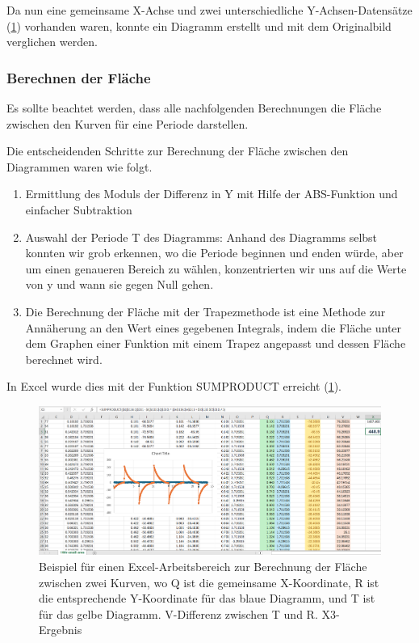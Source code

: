 \documentclass{article}
\begin{document}
Da nun eine gemeinsame X-Achse und zwei unterschiedliche Y-Achsen-Datensätze (\ref{img:excel_example}) vorhanden waren, konnte ein Diagramm erstellt und mit dem Originalbild verglichen werden.

\subsubsection{Berechnen der Fläche} 

Es sollte beachtet werden, dass alle nachfolgenden Berechnungen die Fläche zwischen den Kurven für eine Periode darstellen.

Die entscheidenden Schritte zur Berechnung der Fläche zwischen den Diagrammen waren wie folgt.

\begin{enumerate}
    \item Ermittlung des Moduls der Differenz in Y mit Hilfe der ABS-Funktion und einfacher Subtraktion
    \item Auswahl der Periode T des Diagramms: Anhand des Diagramms selbst konnten wir grob erkennen, wo die Periode beginnen und enden würde, aber um einen genaueren Bereich zu wählen, konzentrierten wir uns auf die Werte von y und wann sie gegen Null gehen.
    \item Die Berechnung der Fläche mit der Trapezmethode ist eine Methode zur Annäherung an den Wert eines gegebenen Integrals, indem die Fläche unter dem Graphen einer Funktion mit einem Trapez angepasst und dessen Fläche berechnet wird.
\end{enumerate}

In Excel wurde dies mit der Funktion SUMPRODUCT erreicht (\ref{img:excel_example}).

\begin{figure}[ht]
    \centering
    \includegraphics[width=1\textwidth]{figures/excel3.png}
    \caption{Beispiel für einen Excel-Arbeitsbereich zur Berechnung der Fläche zwischen zwei Kurven, wo Q ist die gemeinsame X-Koordinate, R ist die entsprechende Y-Koordinate für das blaue Diagramm, und T ist für das gelbe Diagramm. V-Differenz zwischen T und R. X3-Ergebnis}
    \label{img:excel_example}
\end{figure}
\end{document}
